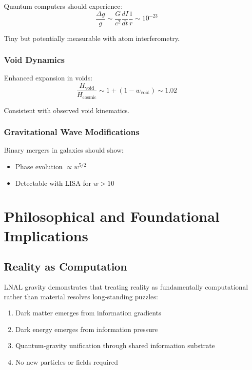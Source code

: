 \documentclass[12pt,letterpaper]{article}
\begin{document}
Quantum computers should experience:
\begin{equation}
\frac{\Delta g}{g} \sim \frac{G}{c^2}\frac{dI}{dt}\frac{1}{r} \sim 10^{-23}
\label{eq:quantum_gravity}
\end{equation}

Tiny but potentially measurable with atom interferometry.

\subsubsection{Void Dynamics}

Enhanced expansion in voids:
\begin{equation}
\frac{H_{\text{void}}}{H_{\text{cosmic}}} \sim 1 + (1-w_{\text{void}}) \sim 1.02
\label{eq:void_H}
\end{equation}

Consistent with observed void kinematics.

\subsubsection{Gravitational Wave Modifications}

Binary mergers in galaxies should show:
\begin{itemize}
\item Phase evolution $\propto w^{5/2}$
\item Detectable with LISA for $w > 10$
\end{itemize}

\section{Philosophical and Foundational Implications}
\label{sec:implications}

\subsection{Reality as Computation}

LNAL gravity demonstrates that treating reality as fundamentally computational rather than material resolves long-standing puzzles:

\begin{enumerate}
\item Dark matter emerges from information gradients
\item Dark energy emerges from information pressure
\item Quantum-gravity unification through shared information substrate
\item No new particles or fields required
\end{enumerate}
\end{document}
